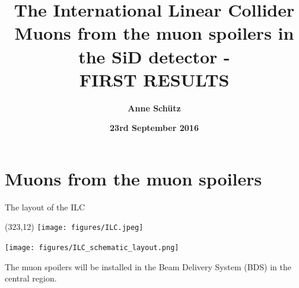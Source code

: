 \documentclass[xcolor={dvipsnames}]{beamer}
\title[ILC \& Muons from spoilers]{\textbf{\LARGE The International Linear Collider \\ \small Muons from the muon spoilers in the SiD detector - \\FIRST RESULTS}}
\author{\textbf{Anne Sch\"utz}}
\institute{\textbf{DESY}}
\date{\textbf{23rd September 2016}}
\newcommand{\ilclogo}{
  \setlength{\TPHorizModule}{1pt}
  \setlength{\TPVertModule}{1pt}
  \begin{textblock}{1}(323,12)
   \texttt{[image: figures/ILC.jpeg]}
  \end{textblock}
}
\begin{document}
{
\begin{frame}
  \titlepage
\end{frame}
}
\begin{frame}
  \tableofcontents
\end{frame}

\section{Muons from the muon spoilers}
\begin{frame}{The layout of the ILC}
\ilclogo
\begin{center}
\texttt{[image: figures/ILC\_schematic\_layout.png]}
\end{center}
The muon spoilers will be installed in the Beam Delivery System (BDS) in the central region.
\end{frame}
\end{document}
